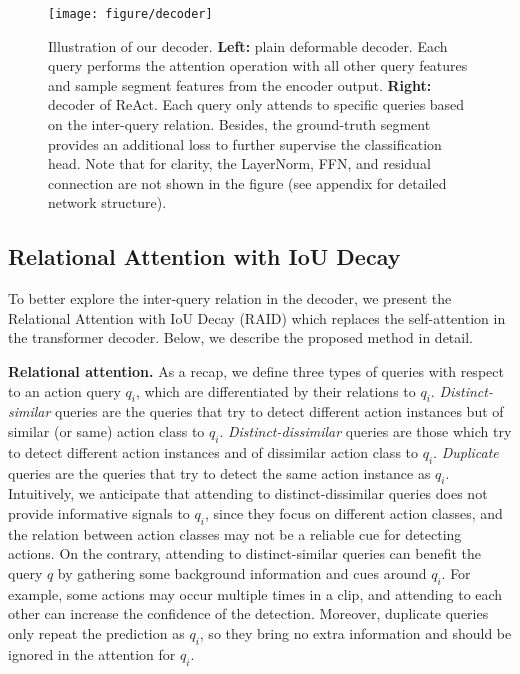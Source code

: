 \documentclass[runningheads]{llncs}
\newcommand{\myPara}[1]{\vspace{.05in}\noindent\textbf{#1}}
\begin{document}
\begin{figure}[t]
    \centering
\texttt{[image: figure/decoder]}
    \caption{Illustration of our decoder. \textbf{Left:} plain deformable decoder. Each query performs the attention operation with all other query features and sample segment features from the encoder output. \textbf{Right:} decoder of ReAct. Each query only attends to specific queries based on the inter-query relation. Besides, the ground-truth segment provides an additional loss to further supervise the classification head. Note that for clarity, the LayerNorm, FFN, and residual connection are not shown in the figure (see appendix for detailed network structure).}
    \label{fig:decoder}
     \vspace{-0.4cm}
\end{figure}


\subsection{Relational Attention with IoU Decay}\label{RAID_sec} To better explore the inter-query relation in the decoder, we present the Relational Attention with IoU Decay (RAID) which replaces the self-attention in the transformer decoder. 
Below, we describe the proposed method in detail.  



\myPara{Relational attention.} 
As a recap, we define three types of queries with respect to an action query $q_i$, which are differentiated by their relations to $q_i$.
\emph{Distinct-similar} queries are the queries that try to detect different action instances but of similar (or same) action class to $q_i$. 
\emph{Distinct-dissimilar} queries are those which try to detect different action instances and of dissimilar action class to $q_i$.
\emph{Duplicate} queries are the queries that try to detect the same action instance as $q_i$.
Intuitively, we anticipate that attending to distinct-dissimilar queries does not provide informative signals to $q_i$, since they focus on different action classes, and the relation between action classes may not be a reliable cue for detecting actions. On the contrary, attending to distinct-similar queries can benefit the query $q$ by gathering some background information and cues around $q_i$. For example, some actions may occur multiple times in a clip, and attending to each other can increase the confidence of the detection.
Moreover, duplicate queries only repeat the prediction as $q_i$, so they bring no extra information and should be ignored in the attention for $q_i$.
\end{document}
